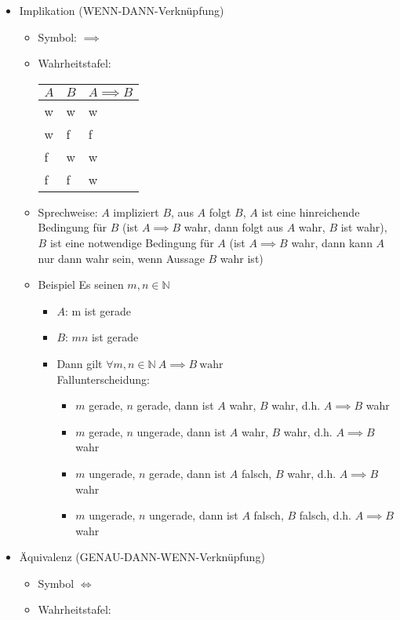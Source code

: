 \documentclass[a4paper]{scrartcl}
\DeclareMathOperator{\Forall}{\forall}
\theoremstyle{definition}
\theoremstyle{plain}
\theoremstyle{plain}
\theoremstyle{remark}
\theoremstyle{remark}
\theoremstyle{remark}
\theoremstyle{remark}
\theoremstyle{remark}
\begin{document}
\begin{itemize}
\item Implikation (WENN-DANN-Verknüpfung)
\begin{itemize}
\item Symbol: $\implies$
\item Wahrheitstafel:
\begin{center}
\begin{tabular}{lll}
$A$ & $B$ & $A\implies B$\\
\hline
w & w & w\\
w & f & f\\
f & w & w\\
f & f & w\\
\end{tabular}
\end{center}
\item Sprechweise: $A$ impliziert $B$, aus $A$ folgt $B$, $A$ ist eine hinreichende Bedingung für $B$ (ist $A\implies B$ wahr, dann folgt aus $A$ wahr, $B$ ist wahr), $B$ ist eine notwendige Bedingung für $A$ (ist $A\implies B$ wahr, dann kann $A$ nur dann wahr sein, wenn Aussage $B$ wahr ist)
\item Beispiel Es seinen $m,n\in\mathbb{N}$
\begin{itemize}
\item $A$: m ist gerade
\item $B$: $mn$ ist gerade
\item Dann gilt $\Forall m,n \in\mathbb{N}~A\implies B~\text{wahr}$ \\
         Fallunterscheidung:
\begin{itemize}
\item $m$ gerade, $n$ gerade, dann ist $A$ wahr, $B$ wahr, d.h. $A\implies B$ wahr
\item $m$ gerade, $n$ ungerade, dann ist $A$ wahr, $B$ wahr, d.h. $A\implies B$ wahr
\item $m$ ungerade, $n$ gerade, dann ist $A$ falsch, $B$ wahr, d.h. $A\implies B$ wahr
\item $m$ ungerade, $n$ ungerade, dann ist $A$ falsch, $B$ falsch, d.h. $A\implies B$ wahr
\end{itemize}
\end{itemize}
\end{itemize}
\item Äquivalenz (GENAU-DANN-WENN-Verknüpfung)
\begin{itemize}
\item Symbol $\iff$
\item Wahrheitstafel:
\begin{center}

\end{center}
\end{itemize}
\end{itemize}
\end{document}
